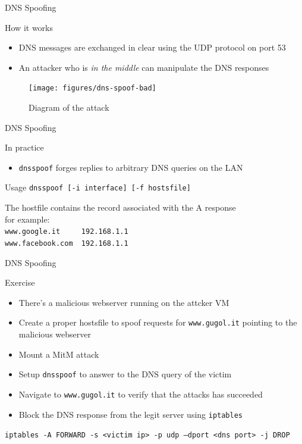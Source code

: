 \documentclass{beamer}
\begin{document}
\begin{frame}{DNS Spoofing}
  \begin{block}{How it works}
    \begin{itemize}
      \item DNS messages are exchanged in clear using the UDP protocol on port 53
      \item An attacker who is \textit{in the middle} can manipulate the DNS responses
    \end{itemize}
  \end{block}
  \begin{figure}
    \texttt{[image: figures/dns-spoof-bad]}
    \caption*{Diagram of the attack}
  \end{figure}
\end{frame}
\begin{frame}{DNS Spoofing}
  \begin{block}{In practice}
    \begin{itemize}
      \item \texttt{dnsspoof} forges replies to arbitrary DNS queries on the LAN
    \end{itemize}
  \end{block}
  \begin{block}{Usage}
    \texttt{dnsspoof [-i interface] [-f hostsfile]}
    \begin{block}{}
      The hostfile contains the record associated with the A response\\
      for example:\\
      \texttt{www.google.it  ~~~~192.168.1.1}\\
      \texttt{www.facebook.com   ~192.168.1.1}
    \end{block}
  \end{block}
\end{frame}
\begin{frame}{DNS Spoofing}
  \begin{block}{Exercise}
    \begin{itemize}
      \item There's a malicious webserver running on the attcker VM
      \item Create a proper hostsfile to spoof requests for \texttt{www.gugol.it} pointing to the malicious webserver
      \item Mount a MitM attack
      \item Setup \texttt{dnsspoof} to answer to the DNS query of the victim
      \item Navigate to \texttt{www.gugol.it} to verify that the attacks has succeeded
      \pause
      \item Block the DNS response from the legit server using \texttt{iptables}
    \end{itemize}
  \end{block}
  \pause
  \texttt{iptables -A FORWARD -s <victim ip> -p udp --dport <dns port> -j DROP}
\end{frame}
\end{document}
